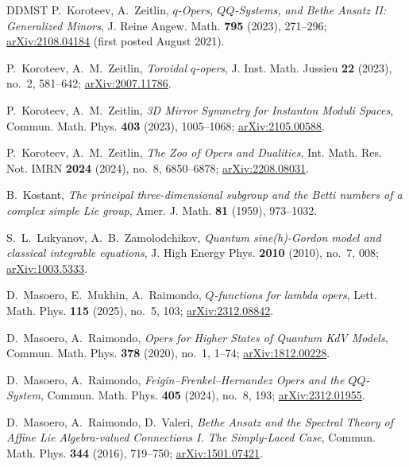 \documentclass[11pt,leqno]{amsart}
\numberwithin{equation}{section}
\theoremstyle{plain}
\theoremstyle{definition}
\theoremstyle{plain}
\theoremstyle{definition}
\theoremstyle{remark}
\begin{document}
\begin{thebibliography}{DDMST}
P.~Koroteev, A.~Zeitlin,
\emph{$q$-Opers, $QQ$-Systems, and Bethe Ansatz II: Generalized Minors},
J. Reine Angew. Math. \textbf{795} (2023), 271--296; \href{https://arxiv.org/abs/2108.04184}{arXiv:2108.04184} (first posted August 2021).

P.~Koroteev, A.~M.~Zeitlin,
\emph{Toroidal $q$-opers},
J. Inst. Math. Jussieu \textbf{22} (2023), no.~2, 581--642;
\href{https://arxiv.org/abs/2007.11786}{arXiv:2007.11786}.

P.~Koroteev, A.~M.~Zeitlin,
\emph{3D Mirror Symmetry for Instanton Moduli Spaces},
Commun. Math. Phys. \textbf{403} (2023), 1005--1068;
\href{https://arxiv.org/abs/2105.00588}{arXiv:2105.00588}.

P.~Koroteev, A.~M.~Zeitlin,
\emph{The Zoo of Opers and Dualities},
Int. Math. Res. Not. IMRN \textbf{2024} (2024), no.~8, 6850--6878;
\href{https://arxiv.org/abs/2208.08031}{arXiv:2208.08031}.

B.~Kostant,
\emph{The principal three-dimensional subgroup and the Betti numbers of a complex simple Lie group},
Amer. J. Math. \textbf{81} (1959), 973--1032.

S.~L.~Lukyanov, A.~B.~Zamolodchikov,
\emph{Quantum sine(h)-Gordon model and classical integrable equations},
J. High Energy Phys. \textbf{2010} (2010), no.~7, 008; \href{https://arxiv.org/abs/1003.5333}{arXiv:1003.5333}.

D.~Masoero, E.~Mukhin, A.~Raimondo,
\emph{$Q$-functions for lambda opers},
Lett. Math. Phys. \textbf{115} (2025), no.~5, 103; \href{https://arxiv.org/abs/2312.08842}{arXiv:2312.08842}.

D.~Masoero, A.~Raimondo,
\emph{Opers for Higher States of Quantum KdV Models},
Commun. Math. Phys. \textbf{378} (2020), no.~1, 1--74; \href{https://arxiv.org/abs/1812.00228}{arXiv:1812.00228}.

D.~Masoero, A.~Raimondo,
\emph{Feigin--Frenkel--Hernandez Opers and the $QQ$-System},
Commun. Math. Phys. \textbf{405} (2024), no.~8, 193; \href{https://arxiv.org/abs/2312.01955}{arXiv:2312.01955}.

D.~Masoero, A.~Raimondo, D.~Valeri,
\emph{Bethe Ansatz and the Spectral Theory of Affine Lie Algebra-valued Connections I. The Simply-Laced Case},
Commun. Math. Phys. \textbf{344} (2016), 719--750; \href{https://arxiv.org/abs/1501.07421}{arXiv:1501.07421}.


\end{thebibliography}
\end{document}
